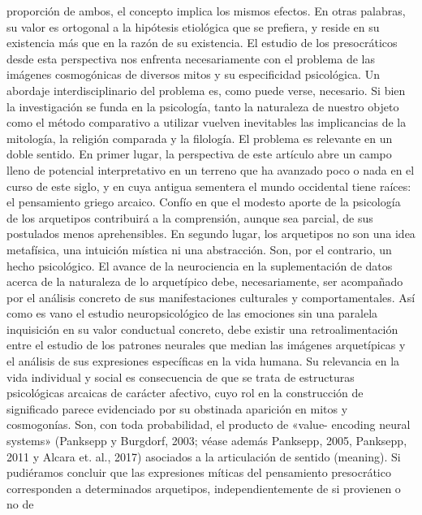 \documentclass[a4paper]{article}
\begin{document}
proporción de ambos, el concepto implica los mismos efectos. En otras palabras,
su valor es ortogonal a la hipótesis etiológica que se prefiera, y reside en su
existencia más que en la razón de su existencia. El estudio de los presocráticos
desde esta perspectiva nos enfrenta necesariamente con el problema de las
imágenes cosmogónicas de diversos mitos y su especificidad psicológica. Un
abordaje interdisciplinario del problema es, como puede verse, necesario. Si
bien la investigación se funda en la psicología, tanto la naturaleza de nuestro
objeto como el método comparativo a utilizar vuelven inevitables las
implicancias de la mitología, la religión comparada y la filología. El problema
es relevante en un doble sentido. En primer lugar, la perspectiva de este
artículo abre un campo lleno de potencial interpretativo en un terreno que ha
avanzado poco o nada en el curso de este siglo, y en cuya antigua sementera el
mundo occidental tiene raíces: el pensamiento griego arcaico. Confío en que el
modesto aporte de la psicología de los arquetipos contribuirá a la comprensión,
aunque sea parcial, de sus postulados menos aprehensibles. En segundo lugar, los
arquetipos no son una idea metafísica, una intuición mística ni una abstracción.
Son, por el contrario, un hecho psicológico. El avance de la neurociencia en la
suplementación de datos acerca de la naturaleza de lo arquetípico debe,
necesariamente, ser acompañado por el análisis concreto de sus manifestaciones
culturales y comportamentales. Así como es vano el estudio neuropsicológico de
las emociones sin una paralela inquisición en su valor conductual concreto, debe
existir una retroalimentación entre el estudio de los patrones neurales que
median las imágenes arquetípicas y el análisis de sus expresiones específicas en
la vida humana. Su relevancia en la vida individual y social es consecuencia de
que se trata de estructuras psicológicas arcaicas de carácter afectivo, cuyo rol
en la construcción de significado parece evidenciado por su obstinada aparición
en mitos y cosmogonías. Son, con toda probabilidad, el producto de «value-
encoding neural systems» (Panksepp y Burgdorf, 2003; véase además Panksepp,
2005, Panksepp, 2011 y Alcara et. al., 2017) asociados a la articulación de
sentido (meaning). Si pudiéramos concluir que las expresiones míticas del
pensamiento presocrático corresponden a determinados arquetipos,
independientemente de si provienen o no de
\end{document}
